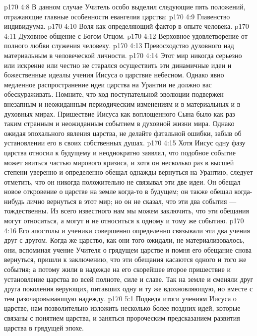 \vs p170 4:8 В данном случае Учитель особо выделил следующие пять положений, отражающие главные особенности евангелия царства:
\vs p170 4:9 \bibnobreakspace Главенство индивидуума.
\vs p170 4:10 \bibnobreakspace Воля как определяющий фактор в опыте человека.
\vs p170 4:11 \bibnobreakspace Духовное общение с Богом Отцом.
\vs p170 4:12 \bibnobreakspace Верховное удовлетворение от полного любви служения человеку.
\vs p170 4:13 \bibnobreakspace Превосходство духовного над материальным в человеческой личности.
\vs p170 4:14 \pc Этот мир никогда серьезно или искренне или честно не старался осуществить эти динамичные идеи и божественные идеалы учения Иисуса о царствие небесном. Однако явно медленное распространение идеи царства на Урантии не должно вас обескураживать. Помните, что ход поступательной эволюции подвержен внезапным и неожиданным периодическим изменениям и в материальных и в духовных мирах. Пришествие Иисуса как воплощенного Сына было как раз таким странным и неожиданным событием в духовной жизни мира. Однако ожидая эпохального явления царства, не делайте фатальной ошибки, забыв об установлении его в своих собственных душах.
\vs p170 4:15 Хотя Иисус одну фазу царства относил к будущему и неоднократно заявлял, что подобное событие может явиться частью мирового кризиса, и хотя он несколько раз в высшей степени уверенно и определенно обещал однажды вернуться на Урантию, следует отметить, что он никогда положительно не связывал эти две идеи. Он обещал новое откровение о царстве на земле когда\hyp{}то в будущем; он также обещал когда\hyp{}нибудь лично вернуться в этот мир; но он не сказал, что эти два события --- тождественны. Из всего известного нам мы можем заключить, что эти обещания могут относиться, а могут и не относиться к одному и тому же событию.
\vs p170 4:16 Его апостолы и ученики совершенно определенно связывали эти два учения друг с другом. Когда же царство, как они того ожидали, не материализовалось, они, вспоминая учение Учителя о грядущем царстве и помня его обещание снова вернуться, пришли к заключению, что эти обещания касаются одного и того же события; а потому жили в надежде на его скорейшее второе пришествие и установление царства во всей полноте, силе и славе. Так на земле и сменяли друг друга поколения верующих, питавших одну и ту же вдохновляющую, но вместе с тем разочаровывающую надежду.
\vs p170 5:1 Подведя итоги учениям Иисуса о царстве, нам позволительно изложить несколько более поздних идей, которые связаны с понятием царства, и заняться пророческим предсказанием развития царства в грядущей эпохе.
